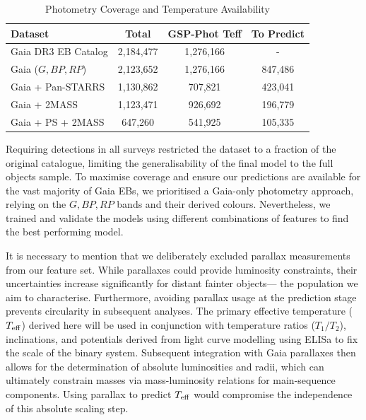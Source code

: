 \documentclass[preprint,12pt,authoryear]{elsarticle}
\begin{document}
\begin{table}[htbp]
\centering
\caption{Photometry Coverage and Temperature Availability}
\label{tab:coverage}
\begin{tabular}{l c c c}
\hline
\textbf{Dataset} & \textbf{Total} & \textbf{GSP-Phot Teff} & \textbf{To Predict} \\
\hline
Gaia DR3 EB Catalog & 2,184,477 & 1,276,166  & - \\
Gaia ($G, BP, RP$) & 2,123,652  & 1,276,166 & 847,486 \\
Gaia + Pan-STARRS & 1,130,862  & 707,821 & 423,041 \\
Gaia + 2MASS & 1,123,471 & 926,692 & 196,779 \\
Gaia + PS + 2MASS & 647,260  & 541,925 & 105,335 \\
\hline
\end{tabular}
\end{table}

Requiring detections in all surveys restricted the dataset to a fraction of the original catalogue, limiting the generalisability of the final model to the full objects sample. 
To maximise coverage and ensure our predictions are available for the vast majority of Gaia EBs, we prioritised a Gaia-only photometry approach, relying on the $G, BP, RP$ bands and their derived colours.
Nevertheless, we trained and validate the models using different combinations of features to find the best performing model.

It is necessary to mention that we deliberately excluded parallax measurements from our feature set. 
While parallaxes could provide luminosity constraints, their uncertainties increase significantly for distant fainter objects--- the population we aim to characterise. 
Furthermore, avoiding parallax usage at the prediction stage prevents circularity in subsequent analyses. 
The primary effective temperature ($T_{\rm eff}$) derived here will be used in conjunction with temperature ratios ($T_1/T_2$), inclinations, and potentials derived from light curve modelling using ELISa to fix the scale of the binary system. 
Subsequent integration with Gaia parallaxes then allows for the determination of absolute luminosities and radii, which can ultimately constrain masses via mass-luminosity relations for main-sequence components. 
Using parallax to predict $T_{\rm eff}$ would compromise the independence of this absolute scaling step.
\end{document}
